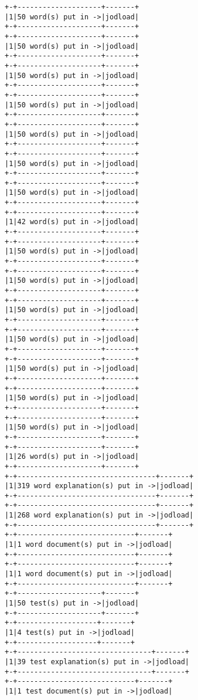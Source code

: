 \documentclass[11pt,letter,landscape]{article}
\begin{document}
    \begin{Verbatim}[commandchars=\\\{\}]
+-+--------------------+-------+
|1|50 word(s) put in ->|jodload|
+-+--------------------+-------+
+-+--------------------+-------+
|1|50 word(s) put in ->|jodload|
+-+--------------------+-------+
+-+--------------------+-------+
|1|50 word(s) put in ->|jodload|
+-+--------------------+-------+
+-+--------------------+-------+
|1|50 word(s) put in ->|jodload|
+-+--------------------+-------+
+-+--------------------+-------+
|1|50 word(s) put in ->|jodload|
+-+--------------------+-------+
+-+--------------------+-------+
|1|50 word(s) put in ->|jodload|
+-+--------------------+-------+
+-+--------------------+-------+
|1|50 word(s) put in ->|jodload|
+-+--------------------+-------+
+-+--------------------+-------+
|1|42 word(s) put in ->|jodload|
+-+--------------------+-------+
+-+--------------------+-------+
|1|50 word(s) put in ->|jodload|
+-+--------------------+-------+
+-+--------------------+-------+
|1|50 word(s) put in ->|jodload|
+-+--------------------+-------+
+-+--------------------+-------+
|1|50 word(s) put in ->|jodload|
+-+--------------------+-------+
+-+--------------------+-------+
|1|50 word(s) put in ->|jodload|
+-+--------------------+-------+
+-+--------------------+-------+
|1|50 word(s) put in ->|jodload|
+-+--------------------+-------+
+-+--------------------+-------+
|1|50 word(s) put in ->|jodload|
+-+--------------------+-------+
+-+--------------------+-------+
|1|50 word(s) put in ->|jodload|
+-+--------------------+-------+
+-+--------------------+-------+
|1|26 word(s) put in ->|jodload|
+-+--------------------+-------+
+-+---------------------------------+-------+
|1|319 word explanation(s) put in ->|jodload|
+-+---------------------------------+-------+
+-+---------------------------------+-------+
|1|268 word explanation(s) put in ->|jodload|
+-+---------------------------------+-------+
+-+----------------------------+-------+
|1|1 word document(s) put in ->|jodload|
+-+----------------------------+-------+
+-+----------------------------+-------+
|1|1 word document(s) put in ->|jodload|
+-+----------------------------+-------+
+-+--------------------+-------+
|1|50 test(s) put in ->|jodload|
+-+--------------------+-------+
+-+-------------------+-------+
|1|4 test(s) put in ->|jodload|
+-+-------------------+-------+
+-+--------------------------------+-------+
|1|39 test explanation(s) put in ->|jodload|
+-+--------------------------------+-------+
+-+----------------------------+-------+
|1|1 test document(s) put in ->|jodload|

\end{Verbatim}
\end{document}
